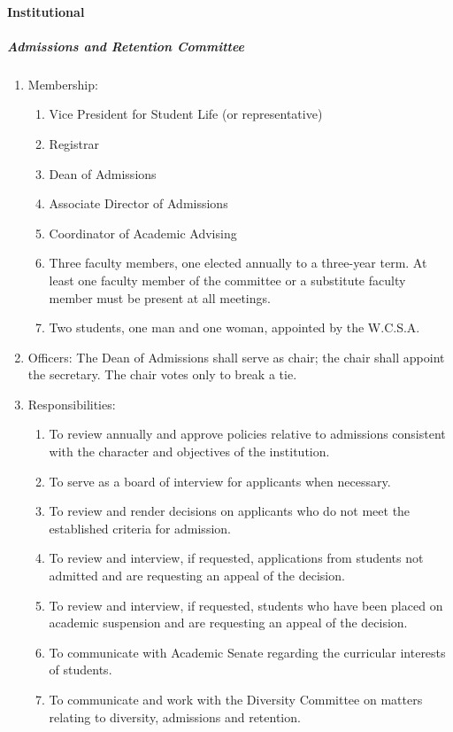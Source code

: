 \documentclass[letterpaper, 11pt]{article}
\begin{document}
			\paragraph{Institutional}
				\subparagraph{Admissions and Retention Committee}
					\begin{enumerate}[label=\alph*)]
						\item{Membership:
							\begin{enumerate}[label=\arabic*)]
								\item{Vice President for Student Life (or representative)}
								\item{Registrar}
								\item{Dean of Admissions}
								\item{Associate Director of Admissions}
								\item{Coordinator of Academic Advising}
								\item{Three faculty members, one elected annually to a three-year term.  At least one faculty member of the committee or a substitute faculty member must be present at all meetings.}
								\item{Two students, one man and one woman, appointed by the W.C.S.A.}
							\end{enumerate}
						}
						\item{Officers:
							The Dean of Admissions shall serve as chair; the chair shall appoint the secretary.  The chair votes only to break a tie.
						}
						\item{Responsibilities:
							\begin{enumerate}[label=\arabic*)]
								\item{To review annually and approve policies relative to admissions consistent with the character and objectives of the institution.}
								\item{To serve as a board of interview for applicants when necessary.}
								\item{To review and render decisions on applicants who do not meet the established criteria for admission.}
								\item{To review and interview, if requested, applications from students not admitted and are requesting an appeal of the decision.}
								\item{To review and interview, if requested, students who have been placed on academic suspension and are requesting an appeal of the decision.}
								\item{To communicate with Academic Senate regarding the curricular interests of students.}
								\item{To communicate and work with the Diversity Committee on matters relating to diversity, admissions and retention.}
							\end{enumerate}
						}
					\end{enumerate}
\end{document}

